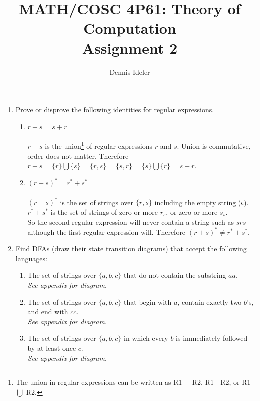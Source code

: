\documentclass[10pt,a4paper,final]{article}
\author{Dennis Ideler}
\title{MATH/COSC 4P61: Theory of Computation\\Assignment 2}
\begin{document}
\maketitle

\begin{enumerate}
\item %
Prove or disprove the following identities for regular expressions.
  \begin{enumerate}
  \item $r + s = s + r$\\
  \\
  $r + s$ is the union\footnote{The union in regular expressions can be written as R1 $+$ R2, R1 $|$ R2,
  or R1 $\bigcup$ R2.} of regular expressions $r$ and $s$. Union is commutative, order does not
  matter. Therefore $r + s = \{r\} \bigcup \{s\} = \{r,s\} = \{s,r\} = \{s\} \bigcup \{r\} = s + r$.
  
  \item $(r + s)^* = r^* + s^*$\\
  \\
  $(r + s)^*$ is the set of strings over $\{r,s\}$ including the empty string ($\epsilon$).\\
  $r^* + s^*$ is the set of strings of zero or more $r_s$, or zero or more $s_s$.\\
  So the second regular expression will never contain a string such as $srs$ although the first
  regular expression will. Therefore $(r + s)^* \neq r^* + s^*$.
  \end{enumerate}

\item %
Find DFAs (draw their state transition diagrams) that accept the following languages:
  \begin{enumerate}
  \item The set of strings over $\{a,b,c\}$ that do not contain the substring $aa$.\\
  \emph{See appendix for diagram}.

  \item The set of strings over $\{a,b,c\}$ that begin with $a$, contain exactly two $b$'s,
  and end with $cc$.\\
  \emph{See appendix for diagram}.

  \item The set of strings over $\{a,b,c\}$ in which every $b$ is immediately followed by at least
  once $c$.\\
  \emph{See appendix for diagram}.


\end{enumerate}
\end{enumerate}
\end{document}

